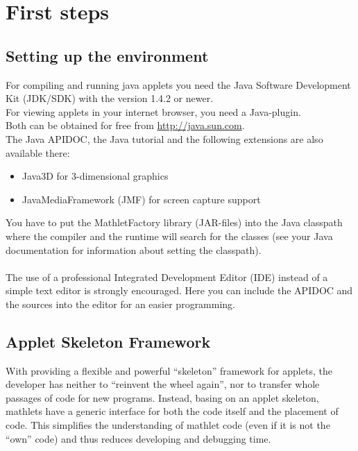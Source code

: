 
\author{Markus Gronau}

\section{First steps}

  \subsection{Setting up the environment}
  For compiling and running java applets you need the Java Software Development Kit 
  (JDK/SDK) with the version 1.4.2 or newer.\\
  For viewing applets in your internet browser, you need a Java-plugin.\\
  Both can be obtained for free from \url{http://java.sun.com}.\\
  The Java APIDOC, the Java tutorial and the following extensions are also available there:
  \begin{itemize}
    \item Java3D for 3-dimensional graphics
    \item JavaMediaFramework (JMF) for screen capture support
  \end{itemize}
  
  You have to put the MathletFactory library (JAR-files) into the Java classpath
  where the compiler and the runtime will search for the classes (see your 
  Java documentation for information about setting the classpath).
  \\\\
  The use of a professional Integrated Development Editor (IDE) instead of a simple
  text editor is strongly encouraged. Here you can include the APIDOC and the sources
  into the editor for an easier programming.
  
  \subsection{Applet Skeleton Framework}

	With providing a flexible and powerful ``skeleton'' framework for applets, the developer has neither to
	``reinvent the wheel again'', nor to transfer whole passages of code for new programs. Instead, basing
	on an applet skeleton, mathlets have a generic interface for both the code itself and the placement of
	code. This simplifies the understanding of mathlet code (even if it is not the ``own'' code) and thus
	reduces developing and debugging time.

